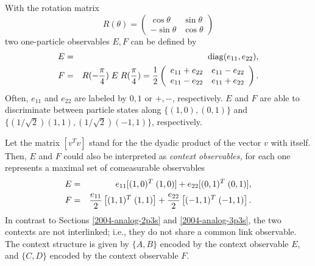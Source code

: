 \documentclass[pra,preprint,showpacs,showkeys,amsfonts]{revtex4}
\begin{document}
With the rotation matrix
\begin{equation}
R(\theta ) =
\left(
\begin{array}{cccc}
\cos \theta &\sin \theta \\
-\sin \theta &\cos \theta
\end{array}
\right)
\end{equation}
two one-particle observables $E,F$ can be defined by
\begin{eqnarray}
E &=&
{\rm diag}(e_{11},e_{22}),
\label{2004-analog-Epiover4}
\\
F &=& R(-{\pi \over 4})\; E \; R({\pi \over 4})
=
{1\over {2}}\left(
\begin{array}{cccc}
e_{11}+e_{22}&e_{11}-e_{22}\\
e_{11}-e_{22}&e_{11}+e_{22}
\end{array}
\right) .
\label{2004-analog-Epiover4b}
\end{eqnarray}
Often,
$e_{11}$
and
$e_{22}$
are  labeled by $0,1$ or $+,-$, respectively.
$E$ and $F$ are able to discriminate between particle states along
$\{(1,0),(0,1)\}$
and
$\{(1/\sqrt{2})(1,1),(1/\sqrt{2})(-1,1)\}$,
respectively.

Let
the matrix $[{ v}^T{ v}]$
stand for the the dyadic product
of the vector ${ v}$ with itself.
Then,
$E$ and $F$ could also be interpreted as {\em context observables,}
for each one represents a maximal set of comeasurable observables
\begin{eqnarray}
E &=&  e_{11}[(1,0)^T\;(1,0)] + e_{22}[(0,1)^T\;(0,1)],
\label{2004-analog-Epiover4c}
\\
F &=&  {e_{11}\over 2}\left[(1,1)^T\; (1,1)\right]
+ {e_{22}\over 2}\left[(-1,1)^T\;(-1,1)\right] .
\label{2004-analog-Epiover4bc}
\end{eqnarray}
In contrast to Sections
\ref{2004-analog-2p3s}
and
\ref{2004-analog-3p3s},
the two contexts are not interlinked;
i.e.,
they do not share a common link observable.
The context structure is given by $\{A,B\}$ encoded by the context observable $E$,
and $\{C,D\}$ encoded by the context observable $F$.
\end{document}
